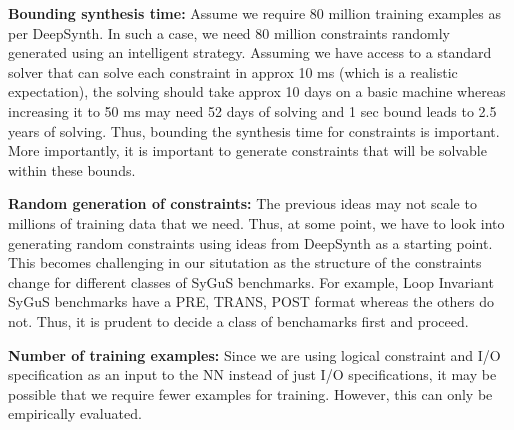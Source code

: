 \smallskip
\noindent\textbf{Bounding synthesis time:}
Assume we require 80 million training examples as per DeepSynth. In such a case, we need 80 million constraints randomly generated using an intelligent strategy. Assuming we have access to a standard solver that can solve each constraint in approx 10 ms (which is a realistic expectation), the solving should take approx 10 days on a basic machine whereas increasing it to 50 ms may need 52 days of solving and 1 sec bound leads to 2.5 years of solving. Thus, bounding the synthesis time for constraints is important. More importantly, it is important to generate constraints that will be solvable within these bounds.

\smallskip
\noindent\textbf{Random generation of constraints:}
The previous ideas may not scale to millions of training data that we need. Thus, at some point, we have to look into generating random constraints using ideas from DeepSynth as a starting point. This becomes challenging in our situtation as the structure of the constraints change for different classes of SyGuS benchmarks. For example, Loop Invariant SyGuS benchmarks have a PRE, TRANS, POST format whereas the others do not. Thus, it is prudent to decide a class of benchamarks first and proceed.

\smallskip
\noindent\textbf{Number of training examples:}
Since we are using logical constraint and I/O specification as an input to the NN instead of just I/O specifications, it may be possible that we require fewer examples for training. However, this can only be empirically evaluated.
